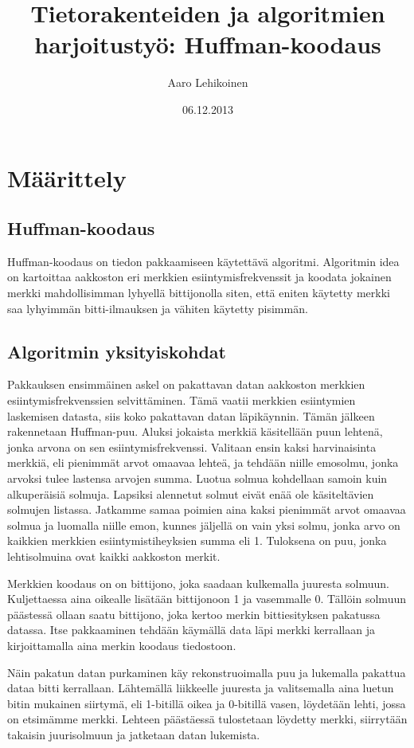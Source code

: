 \documentclass[a4paper, 12pt, finnish]{article}
\title{Tietorakenteiden ja algoritmien harjoitustyö: Huffman-koodaus}
\author{
  Aaro Lehikoinen
}
\date{06.12.2013}
\begin{document}
 \maketitle

  \section{Määrittely}

   \subsection{Huffman-koodaus}
Huffman-koodaus on tiedon pakkaamiseen käytettävä algoritmi. Algoritmin idea on kartoittaa aakkoston eri merkkien esiintymisfrekvenssit ja koodata jokainen merkki mahdollisimman lyhyellä bittijonolla siten, että eniten käytetty merkki saa lyhyimmän bitti-ilmauksen ja vähiten käytetty pisimmän.

   \subsection{Algoritmin yksityiskohdat}
Pakkauksen ensimmäinen askel on pakattavan datan aakkoston merkkien esiintymisfrekvenssien selvittäminen. Tämä vaatii merkkien esiintymien laskemisen datasta, siis koko pakattavan datan läpikäynnin. Tämän jälkeen rakennetaan Huffman-puu. Aluksi jokaista merkkiä käsitellään puun lehtenä, jonka arvona on sen esiintymisfrekvenssi. Valitaan ensin kaksi harvinaisinta merkkiä, eli pienimmät arvot omaavaa lehteä, ja tehdään niille emosolmu, jonka arvoksi tulee lastensa arvojen summa. Luotua solmua kohdellaan samoin kuin alkuperäisiä solmuja. Lapsiksi alennetut solmut eivät enää ole käsiteltävien solmujen listassa. Jatkamme samaa poimien aina kaksi pienimmät arvot omaavaa solmua ja luomalla niille emon, kunnes jäljellä on vain yksi solmu, jonka arvo on kaikkien merkkien esiintymistiheyksien summa eli 1. Tuloksena on puu, jonka lehtisolmuina ovat kaikki aakkoston merkit.

Merkkien koodaus on on bittijono, joka saadaan kulkemalla juuresta solmuun. Kuljettaessa aina oikealle lisätään bittijonoon 1 ja vasemmalle 0. Tällöin solmuun päästessä ollaan saatu bittijono, joka kertoo merkin bittiesityksen pakatussa datassa. Itse pakkaaminen tehdään käymällä data läpi merkki kerrallaan ja kirjoittamalla aina merkin koodaus tiedostoon.

Näin pakatun datan purkaminen käy rekonstruoimalla puu ja lukemalla pakattua dataa bitti kerrallaan. Lähtemällä liikkeelle juuresta ja valitsemalla aina luetun bitin mukainen siirtymä, eli 1-bitillä oikea ja 0-bitillä vasen, löydetään lehti, jossa on etsimämme merkki. Lehteen päästäessä tulostetaan löydetty merkki, siirrytään takaisin juurisolmuun ja jatketaan datan lukemista.
\end{document}
